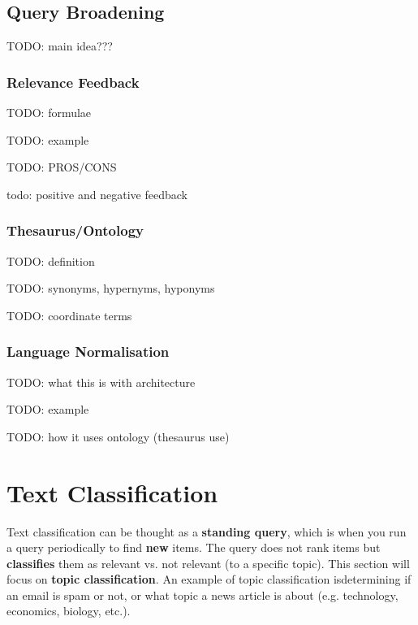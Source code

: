 \documentclass{article}
\begin{document}
\subsection{Query Broadening}

TODO: main idea???

\subsubsection{Relevance Feedback}

TODO: formulae

TODO: example

TODO: PROS/CONS

todo: positive and negative feedback

\subsubsection{Thesaurus/Ontology}

TODO: definition

TODO: synonyms, hypernyms, hyponyms

TODO: coordinate terms

\subsubsection{Language Normalisation}

TODO: what this is with architecture

TODO: example

TODO: how it uses ontology (thesaurus use)

\section{Text Classification}

Text classification can be thought as a \textbf{standing query}, which is when you run a query periodically to find \textbf{new} items. The query does not rank items but \textbf{classifies} them as relevant vs. not relevant (to a specific topic). This section will focus on \textbf{topic classification}. An example of topic classification isdetermining if an email is spam or not, or what topic a news article is about (e.g. technology, economics, biology, etc.).

\paragraph{}
\end{document}
